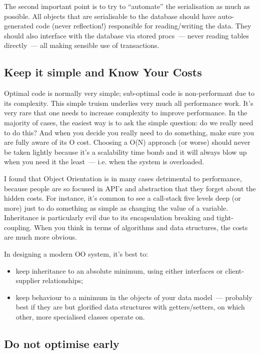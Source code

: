 \documentclass{memoir}
\begin{document}
The second important point is to try to ``automate'' the serialisation
as much as possible. All objects that are serialisable to the database
should have auto-generated code (never reflection!) responsible for
reading/writing the data. They should also interface with the database
via stored procs~--- never reading tables directly~--- all making
sensible use of transactions.

\subsection{Keep it simple and Know Your Costs}

Optimal code is normally very simple; sub-optimal code is
non-performant due to its complexity. This simple truism underlies
very much all performance work. It's very rare that one needs to
increase complexity to improve performance. In the majority of cases,
the easiest way is to ask the simple question: do we really need to do
this? And when you decide you really need to do something, make sure
you are fully aware of its O cost. Choosing a O(N) approach (or worse)
should never be taken lightly because it's a scalability time bomb and
it will always blow up when you need it the least~--- i.e. when the
system is overloaded.

I found that Object Orientation is in many cases detrimental to
performance, because people are so focused in API's and abstraction
that they forget about the hidden costs. For instance, it's common to
see a call-stack five levels deep (or more) just to do something as
simple as changing the value of a variable. Inheritance is
particularly evil due to its encapsulation breaking and
tight-coupling. When you think in terms of algorithms and data
structures, the costs are much more obvious.

In designing a modern OO system, it's best to:

\begin{itemize}
\item keep inheritance to an absolute minimum, using either interfaces
  or client-supplier relationships;
\item keep behaviour to a minimum in the objects of your data
  model~--- probably best if they are but glorified data structures
  with getters/setters, on which other, more specialised classes
  operate on.
\end{itemize}

\subsection{Do not optimise early}
\end{document}
